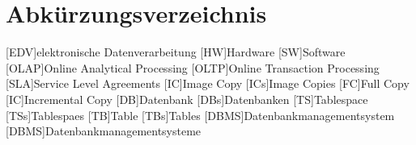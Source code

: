\chapter*{Abkürzungsverzeichnis}
\begin{acronym}

  [EDV]{elektronische Datenverarbeitung}
  [HW]{Hardware}
  [SW]{Software}
  [OLAP]{Online Analytical Processing}
  [OLTP]{Online Transaction Processing}
  [SLA]{Service Level Agreements}
  [IC]{Image Copy}
  [ICs]{Image Copies}
  [FC]{Full Copy}
  [IC]{Incremental Copy}
  [DB]{Datenbank}
  [DBs]{Datenbanken}
  [TS]{Tablespace}
  [TSs]{Tablespaes}
  [TB]{Table}
  [TBs]{Tables}
  [DBMS]{Datenbankmanagementsystem}
  [DBMS]{Datenbankmanagementsysteme}
  

\end{acronym}
